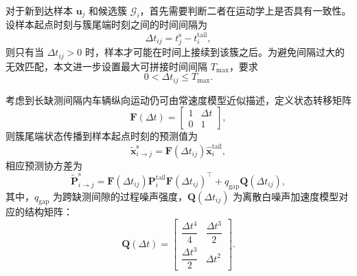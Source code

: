 \documentclass{xdupgthesis}
\begin{document}
对于新到达样本 $\mathbf{u}_j$ 和候选簇 $\mathcal{G}_i$，首先需要判断二者在运动学上是否具有一致性。设样本起点时刻与簇尾端时刻之间的时间间隔为
\begin{equation}
	\Delta t_{ij}=t_j^{\mathrm{s}}-t_i^{\mathrm{tail}},
\end{equation}
则只有当 $\Delta t_{ij}>0$ 时，样本才可能在时间上接续到该簇之后。为避免间隔过大的无效匹配，本文进一步设置最大可拼接时间间隔 $T_{\max}$，要求
\begin{equation}
	0<\Delta t_{ij}\le T_{\max}.
\end{equation}

考虑到长缺测间隔内车辆纵向运动仍可由常速度模型近似描述，定义状态转移矩阵
\begin{equation}
	\mathbf{F}(\Delta t)=
	\begin{bmatrix}
		1 & \Delta t\\
		0 & 1
	\end{bmatrix},
\end{equation}
则簇尾端状态传播到样本起点时刻的预测值为
\begin{equation}
	\tilde{\mathbf{x}}_{i\rightarrow j}^{\mathrm{s}}
	=
	\mathbf{F}(\Delta t_{ij})\hat{\mathbf{x}}_i^{\mathrm{tail}},
\end{equation}
相应预测协方差为
\begin{equation}
	\tilde{\mathbf{P}}_{i\rightarrow j}^{\mathrm{s}}
	=
	\mathbf{F}(\Delta t_{ij})\mathbf{P}_i^{\mathrm{tail}}\mathbf{F}(\Delta t_{ij})^{\top}
	+
	q_{\mathrm{gap}}\mathbf{Q}(\Delta t_{ij}),
\end{equation}
其中，$q_{\mathrm{gap}}$ 为跨缺测间隙的过程噪声强度，$\mathbf{Q}(\Delta t_{ij})$ 为离散白噪声加速度模型对应的结构矩阵：
\begin{equation}
	\mathbf{Q}(\Delta t)=
	\begin{bmatrix}
		\dfrac{\Delta t^4}{4} & \dfrac{\Delta t^3}{2}\\[6pt]
		\dfrac{\Delta t^3}{2} & \Delta t^2
	\end{bmatrix}.
\end{equation}
\end{document}
